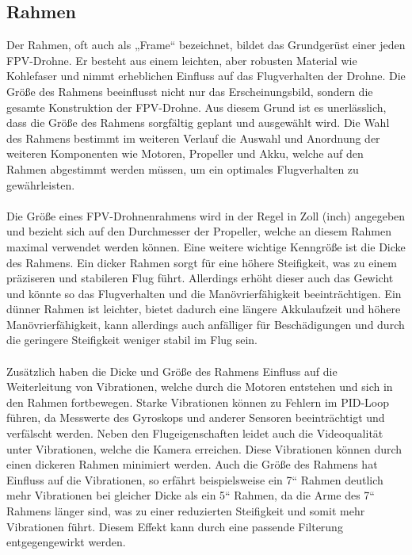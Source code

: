     \subsection[Rahmen]{Rahmen}
        Der Rahmen, oft auch als „Frame“ bezeichnet, bildet das Grundgerüst einer jeden FPV-Drohne. Er besteht aus einem leichten, aber robusten Material wie Kohlefaser und nimmt erheblichen Einfluss auf das Flugverhalten der Drohne. Die Größe des Rahmens beeinflusst nicht nur das Erscheinungsbild, sondern die gesamte Konstruktion der FPV-Drohne. Aus diesem Grund ist es unerlässlich, dass die Größe des Rahmens sorgfältig geplant und ausgewählt wird. Die Wahl des Rahmens bestimmt im weiteren Verlauf die Auswahl und Anordnung der weiteren Komponenten wie Motoren, Propeller und Akku, welche auf den Rahmen abgestimmt werden müssen, um ein optimales Flugverhalten zu gewährleisten.
        \\ \\
        Die Größe eines FPV-Drohnenrahmens wird in der Regel in Zoll (inch) angegeben und bezieht sich auf den Durchmesser der Propeller, welche an diesem Rahmen maximal verwendet werden können. Eine weitere wichtige Kenngröße ist die Dicke des Rahmens. Ein dicker Rahmen sorgt für eine höhere Steifigkeit, was zu einem präziseren und stabileren Flug führt. Allerdings erhöht dieser auch das Gewicht und könnte so das Flugverhalten und die Manövrierfähigkeit beeinträchtigen. Ein dünner Rahmen ist leichter, bietet dadurch eine längere Akkulaufzeit und höhere Manövrierfähigkeit, kann allerdings auch anfälliger für Beschädigungen und durch die geringere Steifigkeit weniger stabil im Flug sein.
        \\ \\
        Zusätzlich haben die Dicke und Größe des Rahmens Einfluss auf die Weiterleitung von Vibrationen, welche durch die Motoren entstehen und sich in den Rahmen fortbewegen. Starke Vibrationen können zu Fehlern im PID-Loop führen, da Messwerte des Gyroskops und anderer Sensoren beeinträchtigt und verfälscht werden. Neben den Flugeigenschaften leidet auch die Videoqualität unter Vibrationen, welche die Kamera erreichen. Diese Vibrationen können durch einen dickeren Rahmen minimiert werden. Auch die Größe des Rahmens hat Einfluss auf die Vibrationen, so erfährt beispielsweise ein 7“ Rahmen deutlich mehr Vibrationen bei gleicher Dicke als ein 5“ Rahmen, da die Arme des 7“ Rahmens länger sind, was zu einer reduzierten Steifigkeit und somit mehr Vibrationen führt. Diesem Effekt kann durch eine passende Filterung entgegengewirkt werden.
    

